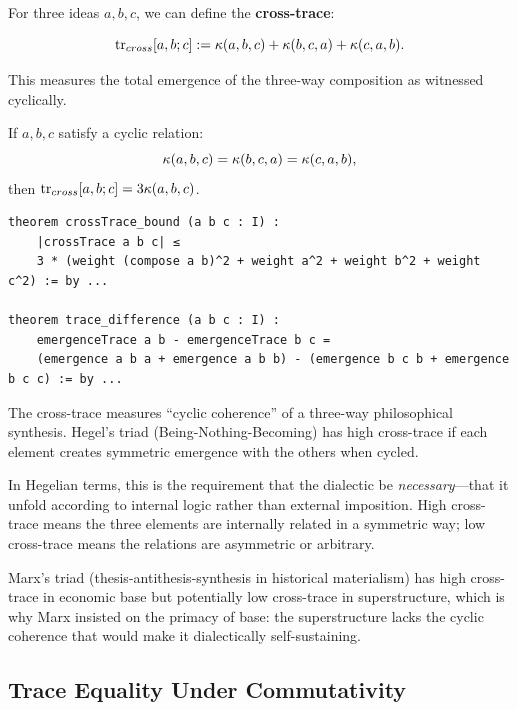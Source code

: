 For three ideas $a, b, c$, we can define the \textbf{cross-trace}:

\begin{definition}
\label{def:cross-trace}
\[
  \mathrm{tr}_{cross}[a, b; c] :=
  \kappa(a, b, c) + \kappa(b, c, a) + \kappa(c, a, b).
\]
\end{definition}

This measures the total emergence of the three-way composition as witnessed
cyclically.

\begin{theorem}
\label{thm:cross-trace-cyclic}
If $a, b, c$ satisfy a cyclic relation:
\[
  \kappa(a, b, c) = \kappa(b, c, a) = \kappa(c, a, b),
\]
then $\mathrm{tr}_{cross}[a,b;c] = 3\kappa(a, b, c)$.
\end{theorem}

\begin{lstlisting}[caption={Cross-trace structure (IDT\_v3\_Emergence.lean)}]
theorem crossTrace_bound (a b c : I) :
    |crossTrace a b c| ≤
    3 * (weight (compose a b)^2 + weight a^2 + weight b^2 + weight c^2) := by ...
    
theorem trace_difference (a b c : I) :
    emergenceTrace a b - emergenceTrace b c =
    (emergence a b a + emergence a b b) - (emergence b c b + emergence b c c) := by ...
\end{lstlisting}

\begin{interpretation}
The cross-trace measures ``cyclic coherence'' of a three-way philosophical
synthesis. Hegel's triad (Being-Nothing-Becoming) has high cross-trace if each
element creates symmetric emergence with the others when cycled.

In Hegelian terms, this is the requirement that the dialectic be \emph{necessary}---that
it unfold according to internal logic rather than external imposition. High
cross-trace means the three elements are internally related in a symmetric way;
low cross-trace means the relations are asymmetric or arbitrary.

Marx's triad (thesis-antithesis-synthesis in historical materialism) has high
cross-trace in economic base but potentially low cross-trace in superstructure,
which is why Marx insisted on the primacy of base: the superstructure lacks
the cyclic coherence that would make it dialectically self-sustaining.
\end{interpretation}

\subsection{Trace Equality Under Commutativity}

